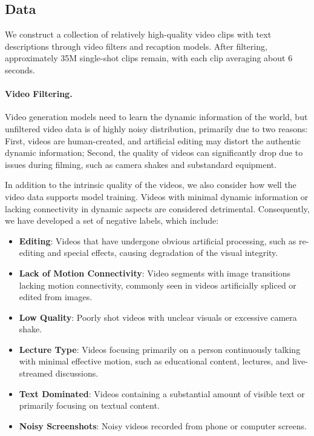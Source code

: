 \subsection{Data}


We construct a collection of relatively high-quality video clips with text descriptions through video filters and recaption models. %
After filtering, approximately 35M single-shot clips remain, with each clip averaging about 6 seconds. 



\paragraph{Video Filtering.}
Video generation models need to learn the dynamic information of the world, but unfiltered video data is of highly noisy distribution, primarily due to two reasons: 
First, videos are human-created, and artificial editing may distort the authentic dynamic information; 
Second, the quality of videos can significantly drop due to issues during filming, such as camera shakes and substandard equipment.

In addition to the intrinsic quality of the videos, we also consider how well the video data supports model training. 
Videos with minimal dynamic information or lacking connectivity in dynamic aspects are considered detrimental. 
Consequently, we have developed a set of negative labels, which include:

\begin{itemize}
    \item \textbf{Editing}: Videos that have undergone obvious artificial processing, such as re-editing and special effects, causing degradation of the visual integrity.
    \item \textbf{Lack of Motion Connectivity}: Video segments with image transitions lacking motion connectivity, commonly seen in videos artificially spliced or edited from images.
    \item \textbf{Low Quality}: Poorly shot videos with unclear visuals or excessive camera shake.
    \item \textbf{Lecture Type}: Videos focusing primarily on a person continuously talking with minimal effective motion, such as educational content, lectures, and live-streamed discussions.
    \item \textbf{Text Dominated}: Videos containing a substantial amount of visible text or primarily focusing on textual content.
    \item \textbf{Noisy Screenshots}: Noisy videos recorded from phone or computer screens.
\end{itemize}

